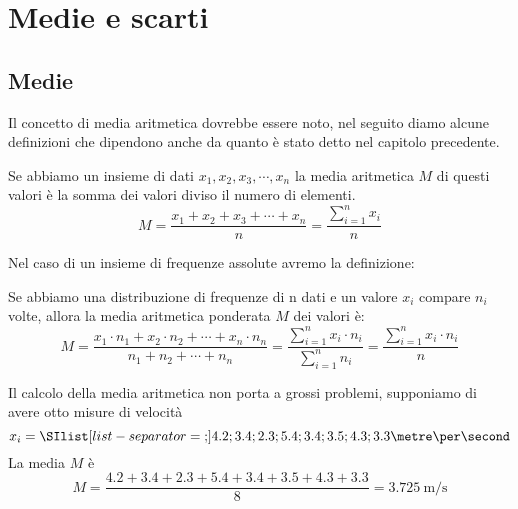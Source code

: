 \chapter{Medie e scarti}
\label{cha:MedieScarti}
\section{Medie}
Il concetto di media aritmetica dovrebbe essere noto, nel seguito diamo alcune definizioni che dipendono anche da quanto è stato detto nel capitolo precedente.
\begin{defn}
	Se abbiamo un insieme di dati $x_{1},x_{2},x_{3},\cdots,x_{n}$ la media aritmetica $M$ di questi valori  è  la somma dei valori diviso il numero di elementi.\[M=\dfrac{x_{1}+x_{2}+x_{3}+\cdots+x_{n}}{n}=\dfrac{\sum_{i=1}^{n}x_{i}}{n} \]
\end{defn}

Nel caso di un insieme  di frequenze assolute avremo la definizione:
\begin{defn}
Se abbiamo una distribuzione di frequenze di n dati e un valore $x_{i}$ compare $n_{i}$ volte,  allora la media aritmetica ponderata  $M$ dei valori è: \[M=\dfrac{x_{1}\cdot n_{1}+x_{2}\cdot n_{2}+\cdots+x_{n}\cdot n_{n}}{n_{1}+n_{2}+\cdots+n_{n} }=\dfrac{\sum_{i=1}^{n}x_{i}\cdot n_{i}}{\sum_{i=1}^{n} n_{i}}=\dfrac{\sum_{i=1}^{n}x_{i}\cdot n_{i}}{n}\]
\end{defn}
Il calcolo della media aritmetica non porta a grossi problemi, supponiamo di avere otto misure di velocità \[x_{i}=\SIlist[list-separator = {;}]{4.2;3.4;2.3;5.4;3.4;3.5;4.3;3.3}{\metre\per\second}\] La media $M$ è \[M=\dfrac{\num{4.2}+\num{3.4}+\num{2.3}+\num{5.4}+\num{3.4}+\num{3.5}+\num{4.3}+\num{3.3}} {8}=\SI{3.725}{\metre\per\second}\]

